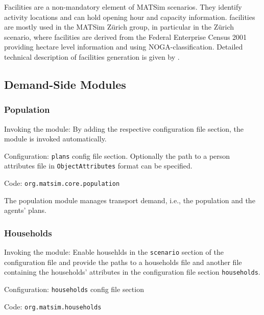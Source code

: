 Facilities are a non-mandatory element of MATSim scenarios. They identify activity locations and can hold opening hour and capacity information. facilities are mostly used in the MATSim Zürich group, in particular in the Zürich scenario, where facilities are derived from the Federal Enterprise Census 2001 \citep[][]{SwissEnterpriseCensus_manual_2001} providing hectare level information and using NOGA-classification. Detailed technical description of facilities generation is given by \citet[][]{Meister_TechRep_IVT_2008, Meister_unpub_IVT_2007}.


\subsection{Demand-Side Modules}
\label{sec:dsm}

\subsubsection{Population}
\label{sec:population}
\begin{compactitem}
\item Invoking the module: By adding the respective configuration file section, the module is invoked automatically.
\item Configuration: \lstinline|plans| config file section. Optionally the path to a person attributes file in \lstinline|ObjectAttributes| format can be specified.
\item Code: \lstinline|org.matsim.core.population|
\end{compactitem}

The population module manages transport demand, i.e., the population and the agents' plans.
\subsubsection{Households}
\label{sec:households}
\begin{compactitem}
\item Invoking the module: Enable househlds in the \lstinline|scenario| section of the configuration file and provide the paths to a households file and another file containing the households' attributes in the configuration file section \lstinline|households|.
\item Configuration: \lstinline|households| config file section
\item Code: \lstinline|org.matsim.households|
\end{compactitem}

